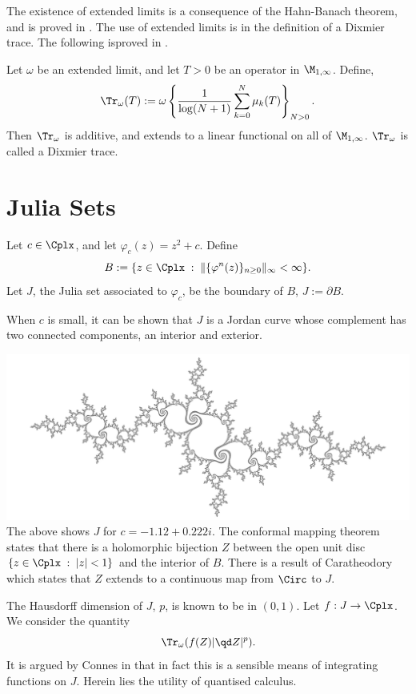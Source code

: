 The existence of extended limits is a consequence of the Hahn-Banach theorem,
and is proved in \cite[Thm 6.2.5]{SingularTraces}. The use
of extended limits is in the definition of a Dixmier trace.
The following isproved in \cite[Ch. 2]{SingularTraces}.
\begin{proposition}
    Let $\omega$ be an extended limit, and let $T > 0$ be an operator
    in $\M_{1,\infty}$. Define,
    \begin{equation}
        \Tr_\omega(T) := \omega\left\{\frac{1}{\log(N+1)}\sum_{k=0}^N \mu_k(T)\right\}_{N > 0}.
    \end{equation}
    Then $\Tr_\omega$ is additive, and extends to a linear functional
    on all of $\M_{1,\infty}$. $\Tr_\omega$ is called a Dixmier trace.
\end{proposition}

\section{Julia Sets}
\begin{definition}
    Let $c \in \Cplx$, and let $\varphi_c(z) = z^2+c$. Define
    \begin{equation}
        B := \{z \in \Cplx\;:\; \|\{\varphi^n(z)\}_{n \geq 0}\|_\infty < \infty\}.
    \end{equation}
    Let $J$, the Julia set associated to $\varphi_c$, be the boundary of $B$,
    $J:= \partial B$.
    
    When $c$ is small, it can be shown that $J$ is a Jordan curve
    whose complement has two connected components, an interior and exterior.
\end{definition}
\includegraphics[width=160mm]{Pictures/Julia_set.png}\\
The above shows $J$ for $c = -1.12+0.222i$.
The conformal mapping theorem states that there is a holomorphic
bijection $Z$ between the open unit disc $\{z \in \Cplx\;:\;|z| < 1\}$
and the interior of $B$. There is a result of Caratheodory
which states that $Z$ extends to a continuous
map from $\Circ$ to $J$. 

The Hausdorff dimension of $J$, $p$, is known to be in $(0,1)$. Let
$f:J\to\Cplx$. We consider the quantity
\begin{equation}
    \Tr_\omega(f(Z)|\qd Z|^p).
\end{equation}
It is argued by Connes in \cite{Connes94} that in fact this is a sensible
means of integrating functions on $J$. Herein lies the utility
of quantised calculus.
